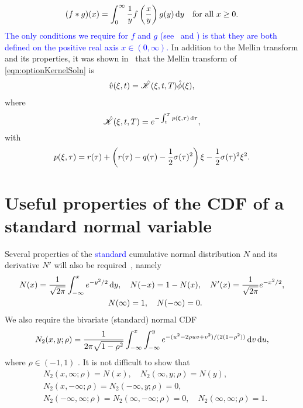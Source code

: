 	\begin{equation}
		\label{eqn:mellinConvolution}
		(f \ast g)(x) = \int_0^\infty \frac{1}{y}f\left(\frac{x}{y}\right)g(y) \, \mathrm d y \quad \text{for all } x \geq 0.
	\end{equation}
\textcolor{blue}{The only conditions we require for $f$ and $g$ (see~\cite[chapter~2]{Titchmarsh1948} and \cite[chapter~11]{Poularikas2000}) is that they are both defined on the positive real axis $x \in (0,\infty)$.} In addition to the Mellin transform and its properties, it was shown in~\cite{Rodrigo2006} that the Mellin transform of \eqref{eqn:optionKernelSoln} is
\begin{align}
		\label{eqn:mellinVkernel}
		\begin{split}
		\hat v(\xi,t) &= \hat {\mathscr K}(\xi,t,T) \hat \phi(\xi), \\
		\end{split}
	\end{align}
where 
\begin{equation}
	\label{eqn:KhatA}
 \hat{\mathscr K}(\xi,t,T) = e^{-\int_t^T p(\xi,\tau) \,  \mathrm d\tau},
 \end{equation} 
with
	\begin{equation}
		\label{eqn:Khat}
		p(\xi,\tau) = r(\tau) + \left( r(\tau) - q(\tau) - \frac{1}{2}\sigma(\tau)^2 \right)\xi - \frac{1}{2}\sigma(\tau)^2\xi^2.
	\end{equation}

\section{Useful properties of the CDF of a standard normal variable}
\label{subsec:cdfproperties}
Several properties of the \textcolor{blue}{standard} cumulative normal distribution $N$ and its derivative $N'$ will also be required~\cite[pp. 235--239]{Jeff1995}, namely
	\begin{equation}
		\begin{split}
		N(x) = \fr{1}{\sqrt{2\pi}}\int_{-\infty}^x e^{-y^2/2} & \, \d y, \quad %
		N(-x) = 1 - N(x), \quad
		N'(x) = \fr{1}{\sqrt{2\pi}}e^{-x^2/2} \label{eqn:Nprime}, \\
		&N(\infty) = 1, \quad N(-\infty) = 0.
		\end{split}
	\end{equation}
We also require the bivariate (standard) normal CDF~\cite{Genz2004}
	\begin{equation}
		\label{eqn:N2}
		N_2(x,y;\rho) = \frac{1}{2\pi\sqrt{1-\rho^2}}\int_{-\infty}^x\int_{-\infty}^y e^{-(u^2-2\rho uv + v^2)/(2(1-\rho^2))} \, \mathrm d v \, \mathrm d u,
	\end{equation}
where $\rho \in (-1,1)$ . It is not difficult to show that	
	\begin{equation}
		\label{eqn:Nspecial}
		\begin{split}
		&N_2(x,\infty;\rho) = N(x), \quad N_2(\infty,y;\rho) = N(y),\\
		&N_2(x,-\infty;\rho) = N_2(-\infty,y;\rho) = 0, \\
		&N_2(-\infty,\infty;\rho) = N_2(\infty,-\infty;\rho) = 0, \quad N_2(\infty,\infty;\rho) = 1.
		\end{split}
	\end{equation}
